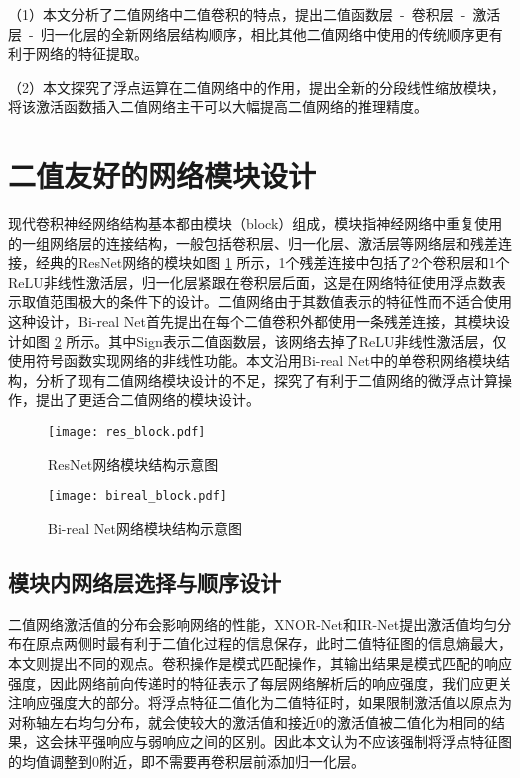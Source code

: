 （1）本文分析了二值网络中二值卷积的特点，提出二值函数层\ -\ 卷积层\ -\ 激活层\ -\ 归一化层的全新网络层结构顺序，相比其他二值网络中使用的传统顺序更有利于网络的特征提取。

（2）本文探究了浮点运算在二值网络中的作用，提出全新的分段线性缩放模块，将该激活函数插入二值网络主干可以大幅提高二值网络的推理精度。

\section{二值友好的网络模块设计}

现代卷积神经网络结构基本都由模块（block）组成，模块指神经网络中重复使用的一组网络层的连接结构，一般包括卷积层、归一化层、激活层等网络层和残差连接，经典的ResNet网络的模块如图 \ref{fig:res_block} 所示，1个残差连接中包括了2个卷积层和1个ReLU非线性激活层，归一化层紧跟在卷积层后面，这是在网络特征使用浮点数表示取值范围极大的条件下的设计。二值网络由于其数值表示的特征性而不适合使用这种设计，Bi-real Net\cite{birealnet}首先提出在每个二值卷积外都使用一条残差连接，其模块设计如图 \ref{fig:bireal_block} 所示。其中Sign表示二值函数层，该网络去掉了ReLU非线性激活层，仅使用符号函数实现网络的非线性功能。本文沿用Bi-real Net\cite{birealnet}中的单卷积网络模块结构，分析了现有二值网络模块设计的不足，探究了有利于二值网络的微浮点计算操作，提出了更适合二值网络的模块设计。

\begin{figure}[htb]
  \vspace{6pt}
  \centering
  \texttt{[image: res\_block.pdf]}
  \caption{ResNet网络模块结构示意图}
  \label{fig:res_block}
\end{figure}

\begin{figure}[htb]
  \vspace{6pt}
  \centering
  \texttt{[image: bireal\_block.pdf]}
  \caption{Bi-real Net网络模块结构示意图}
  \label{fig:bireal_block}
\end{figure}

\subsection{模块内网络层选择与顺序设计}

二值网络激活值的分布会影响网络的性能，XNOR-Net\cite{xnornet}和IR-Net\cite{irnet}提出激活值均匀分布在原点两侧时最有利于二值化过程的信息保存，此时二值特征图的信息熵最大，本文则提出不同的观点。卷积操作是模式匹配操作，其输出结果是模式匹配的响应强度，因此网络前向传递时的特征表示了每层网络解析后的响应强度，我们应更关注响应强度大的部分。将浮点特征二值化为二值特征时，如果限制激活值以原点为对称轴左右均匀分布，就会使较大的激活值和接近0的激活值被二值化为相同的结果，这会抹平强响应与弱响应之间的区别。因此本文认为不应该强制将浮点特征图的均值调整到0附近，即不需要再卷积层前添加归一化层。

